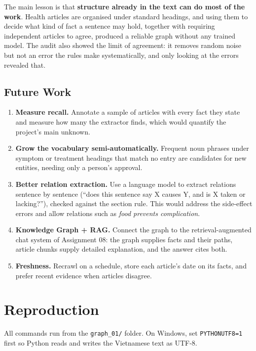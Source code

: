 \documentclass[11pt, a4paper]{article}
\newcommand{\code}[1]{\texttt{#1}}
\begin{document}
The main lesson is that \textbf{structure already in the text can do most of the work}. Health articles are organised under standard headings, and using them to decide what kind of fact a sentence may hold, together with requiring independent articles to agree, produced a reliable graph without any trained model. The audit also showed the limit of agreement: it removes random noise but not an error the rules make systematically, and only looking at the errors revealed that.

\subsection{Future Work}

\begin{enumerate}
    \item \textbf{Measure recall.} Annotate a sample of articles with every fact they state and measure how many the extractor finds, which would quantify the project's main unknown.
    \item \textbf{Grow the vocabulary semi-automatically.} Frequent noun phrases under symptom or treatment headings that match no entry are candidates for new entities, needing only a person's approval.
    \item \textbf{Better relation extraction.} Use a language model to extract relations sentence by sentence (``does this sentence say X causes Y, and is X taken or lacking?''), checked against the section rule. This would address the side-effect errors and allow relations such as \emph{food prevents complication}.
    \item \textbf{Knowledge Graph + RAG.} Connect the graph to the retrieval-augmented chat system of Assignment 08: the graph supplies facts and their paths, article chunks supply detailed explanation, and the answer cites both.
    \item \textbf{Freshness.} Recrawl on a schedule, store each article's date on its facts, and prefer recent evidence when articles disagree.
\end{enumerate}

\appendix
\section{Reproduction}
\label{app:reproduction}

All commands run from the \code{graph\_01/} folder. On Windows, set \code{PYTHONUTF8=1} first so Python reads and writes the Vietnamese text as UTF-8.
\end{document}
